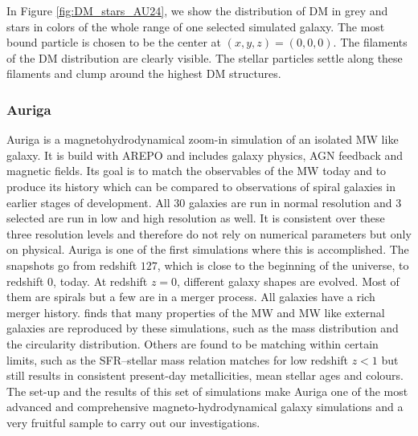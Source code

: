 In Figure \ref{fig:DM_stars_AU24}, we show the distribution of \ac{DM} in grey and stars in colors of the whole range of one selected simulated galaxy. The most bound particle is chosen to be the center at $(x,y,z) = (0,0,0)$. The filaments of the \ac{DM} distribution are clearly visible. The stellar particles settle along these filaments and clump around the highest \ac{DM} structures. 

\subsubsection{Auriga}\label{subsubsec:auriga_intro}
Auriga is a magnetohydrodynamical zoom-in simulation of an isolated \ac{MW} like galaxy. It is build with AREPO \citep{AREPO} and includes galaxy physics, \ac{AGN} feedback and magnetic fields. Its goal is to match the observables of the \ac{MW} today and to produce its history which can be compared to observations of spiral galaxies in earlier stages of development. All 30 galaxies are run in normal resolution and 3 selected are run in low and high resolution as well. It is consistent over these three resolution levels and therefore do not rely on numerical parameters but only on physical. Auriga is one of the first simulations where this is accomplished. The snapshots go from redshift $127$, which is close to the beginning of the universe, to redshift $0$, today.  At redshift $z= 0$, different galaxy shapes are evolved. Most of them are spirals but a few are in a merger process. All galaxies have a rich merger history. \citep{AurigaGrand} finds that many properties of the \ac{MW} and \ac{MW} like external galaxies are reproduced by these simulations, such as the mass distribution and the circularity distribution. Others are found to be matching within certain limits, such as the SFR–stellar mass relation matches for low redshift $z<1$ but still results in consistent present-day metallicities, mean stellar ages and colours. The set-up and the results of this set of simulations make Auriga one of the most advanced and comprehensive magneto-hydrodynamical galaxy simulations and a very fruitful sample to carry out our investigations. \\
